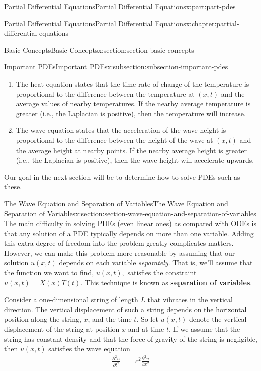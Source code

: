 \documentclass[oneside,10pt,]{book}
\newcommand{\terminology}[1]{\textbf{#1}}
\numberwithin{equation}{part}
\newcommand{\amp}{&}
\begin{document}
\begin{partptx}{Partial Differential Equations}{}{Partial Differential Equations}{}{}{x:part:part-pdes}
\begin{chapterptx}{Partial Differential Equations}{}{Partial Differential Equations}{}{}{x:chapter:partial-differential-equations}
\begin{sectionptx}{Basic Concepts}{}{Basic Concepts}{}{}{x:section:section-basic-concepts}
\begin{subsectionptx}{Important PDEs}{}{Important PDEs}{}{}{x:subsection:subsection-important-pdes}
\begin{enumerate}
\item{}The heat equation states that the time rate of change of the temperature is proportional to the difference between the temperature at \((x,t)\) and the average values of nearby temperatures. If the nearby average temperature is greater (i.e., the Laplacian is positive), then the temperature will increase.%
\item{}The wave equation states that the acceleration of the wave height is proportional to the difference between the height of the wave at \((x,t)\) and the average height at nearby points. If the nearby average height is greater (i.e., the Laplacian is positive), then the wave height will accelerate upwards.%
\end{enumerate}
%
\par
Our goal in the next section will be to determine how to solve PDEs such as these.%
\end{subsectionptx}
\end{sectionptx}
%
%
\typeout{************************************************}
\typeout{************************************************}
%
\begin{sectionptx}{The Wave Equation and Separation of Variables}{}{The Wave Equation and Separation of Variables}{}{}{x:section:section-wave-equation-and-separation-of-variables}
The main difficulty in solving PDEs (even linear ones) as compared with ODEs is that any solution of a PDE typically depends on more than one variable. Adding this extra degree of freedom into the problem greatly complicates matters. However, we can make this problem more reasonable by assuming that our solution \(u(x,t)\) depends on each variable \emph{separately}. That is, we'll assume that the function we want to find, \(u(x,t),\) satisfies the constraint \(u(x,t) = X(x)T(t)\). This technique is known as \terminology{separation of variables}.%
\par
Consider a one-dimensional string of length \(L\) that vibrates in the vertical direction. The vertical displacement of such a string depends on the horizontal position along the string, \(x\), and the time \(t\). So let \(u(x,t)\) denote the vertical displacement of the string at position \(x\) and at time \(t\). If we assume that the string has constant density and that the force of gravity of the string is negligible, then \(u(x,t)\) satisfies the wave equation%
\begin{align}
\frac{\partial^{2}u}{\partial t^{2}} \amp = c^{2}\frac{\partial^{2}u}{\partial x^{2}} \label{x:mrow:equation-wave-equation}

\end{align}
\end{sectionptx}
\end{chapterptx}
\end{partptx}
\end{document}
